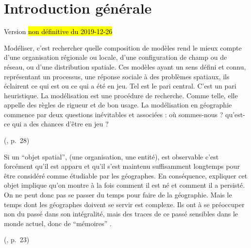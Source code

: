 \setcounter{chapter}{0}
\graphicspath{{chap0-2-Intro/}}

\chapter*{Introduction générale}
\label{chap:intro}
\vspace*{-5em}
\begin{center}
{\large Version \hl{non définitive du 2019-12-26}}
\end{center}
\vspace*{-1em}



\epigraph{
	\og 
	Modéliser, \textelp{} c'est rechercher quelle composition de modèles rend le mieux compte d'une organisation régionale ou locale, d'une configuration de champ ou de réseau, ou d'une distribution spatiale.
	\textelp{}
	Ces modèles ayant un sens défini et connu, représentant un processus, une réponse sociale à des problèmes spatiaux, ils éclairent ce qui est ou ce qui a été en jeu.
	Tel est le pari central. C'est un pari heuristique.
	La modélisation est une procédure de recherche. 
	Comme telle, elle appelle des règles de rigueur et de bon usage.
	La modélisation en géographie commence par deux questions inévitables et associées : où sommes-nous ? qu'est-ce qui a des chances d'être en jeu ?
	\fg{}
}{ (\citeyear{brunet2000modeles}, p.~28)}

\vspace*{-2.5em}\epigraph{
\og Si un ``objet spatial'', (une organisation, une entité), est observable c'est forcément qu'il est apparu et qu'il s'est maintenu suffisamment longtemps pour être considéré comme étudiable par les géographes.
En conséquence, expliquer cet objet implique qu'on montre à la fois comment il est né et comment il a persisté.
On ne peut donc pas se passer du temps pour faire de la géographie.
Mais le temps dont les géographes doivent se servir est complexe.
Ils ont à se préoccuper non du passé dans son intégralité, mais des traces de ce passé sensibles dans le monde actuel, donc de ``mémoires''
\fg{}.
}{ (\citeyear{durand-dastes_jamais_1999}, p.~23)}


